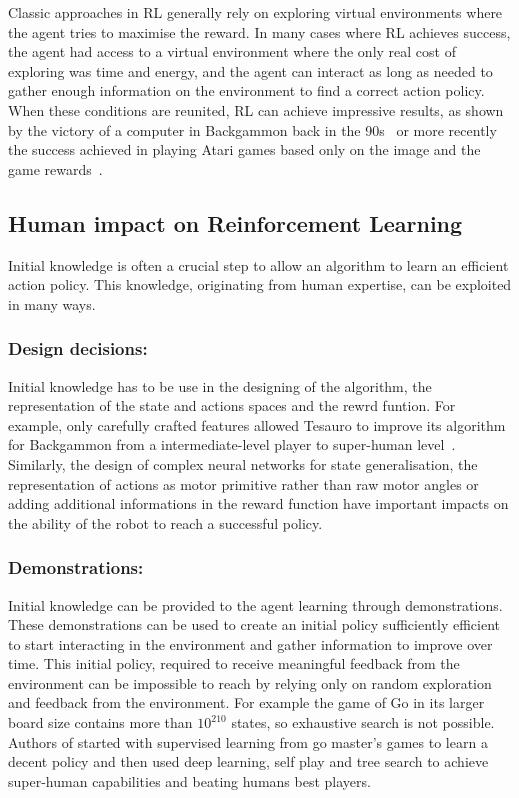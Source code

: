 \documentclass[letterpaper]{article} %
\begin{document}
Classic approaches in RL generally rely on exploring virtual environments where the agent
tries to maximise the reward. In many cases where RL achieves success, the agent
had access to a virtual environment where the only real cost of exploring was 
time and energy, and the agent can interact as long as needed to gather
enough information on the environment to find a correct action policy. When
these conditions are reunited, RL can achieve impressive results, as shown by
the victory of a computer in Backgammon back in the
90s~\cite{tesauro1995temporal} or more recently the success achieved in playing
Atari games based only on the image and the game rewards~\cite{mnih2015human}.

\subsection{Human impact on Reinforcement Learning}

Initial knowledge is often a crucial step to allow an algorithm to learn an
efficient action policy. This knowledge, originating from human expertise, can
be exploited in many ways. 

\subsubsection{Design decisions:}
Initial knowledge has to be use in the designing of the algorithm, the
representation of the state and actions spaces and the rewrd funtion. For
example, only carefully crafted features allowed
Tesauro to improve its algorithm for Backgammon from a intermediate-level player
to super-human level~\cite{tesauro1995temporal}. Similarly, the design of
complex neural networks for state generalisation, the representation of actions
as motor primitive rather than raw motor angles or adding additional
informations in the reward function have important impacts on the ability of
the robot to reach a successful policy.

\subsubsection{Demonstrations:}
Initial knowledge can be provided to the agent learning through demonstrations.
These demonstrations can be used to create an initial policy sufficiently
efficient to start interacting in the environment and gather information to
improve over time. This initial policy, required to receive meaningful feedback
from the environment can be impossible to reach by relying only on random
exploration and feedback from the environment. For example the game of Go in its larger board
size contains more than $10^{210}$ states, so exhaustive search is not possible.
Authors of \cite{silver2016mastering} started with
supervised learning from go master's games to learn a decent policy and then
used deep learning, self play and tree search to achieve super-human
capabilities and beating humans best players.
\end{document}
